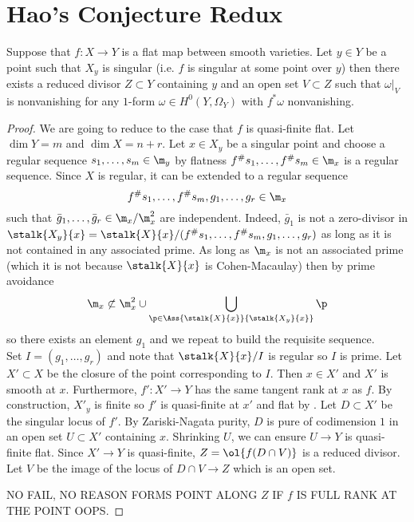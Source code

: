 \documentclass[12pt]{article}
\theoremstyle{plain}
\begin{document}
\section{Hao's Conjecture Redux}

\begin{lemma}
Suppose that $f : X \to Y$ is a flat map between smooth varieties. Let $y \in Y$ be a point such that $X_y$ is singular (i.e. $f$ is singular at some point over $y$) then there exists a reduced divisor $Z \subset Y$ containing $y$ and an open set $V \subset Z$ such that $\omega|_{V}$ is nonvanishing for any $1$-form $\omega \in H^0(Y, \Omega_Y)$ with $f^* \omega$ nonvanishing.
\end{lemma}

\begin{proof}
We are going to reduce to the case that $f$ is quasi-finite flat. Let $\dim{Y} = m$ and $\dim{X} = n + r$. Let $x \in X_y$ be a singular point and choose a regular sequence $s_1, \dots, s_m \in \m_y$ by flatness $f^\# s_1, \dots, f^\# s_m \in \m_x$ is a regular sequence. Since $X$ is regular, it can be extended to a regular sequence
\[ f^\# s_1, \dots, f^\# s_m, g_1, \dots, g_{r} \in \m_x \]
such that $\bar{g}_1, \dots, \bar{g}_r \in \m_x / \m_x^2$ are independent. Indeed, $\bar{g}_1$ is not a zero-divisor in $\stalk{X_y}{x} = \stalk{X}{x} / (f^\# s_1, \dots, f^\# s_m, g_1, \dots, g_{r})$ as long as it is not contained in any associated prime. As long as $\m_x$ is not an associated prime (which it is not because $\stalk{X}{x}$ is Cohen-Macaulay) then by prime avoidance
\[ \m_x \not\subset \m_x^2 \cup \bigcup_{\p \in \Ass{\stalk{X}{x}}{\stalk{X_y}{x}}} \p \]
so there exists an element $g_1$ and we repeat to build the requisite sequence.
\bigskip\\
Set $I = (g_1, \dots, g_r)$ and note that $\stalk{X}{x} / I$ is regular so $I$ is prime. Let $X' \subset X$ be the closure of the point corresponding to $I$. Then $x \in X'$ and $X'$ is smooth at $x$. Furthermore, $f' : X' \to Y$ has the same tangent rank at $x$ as $f$. By construction, $X'_y$ is finite so $f'$ is quasi-finite at $x'$ and flat by . Let $D \subset X'$ be the singular locus of $f'$. By Zariski-Nagata purity, $D$ is pure of codimension $1$ in an open set $U \subset X'$ containing $x$. Shrinking $U$, we can ensure $U \to Y$ is quasi-finite flat. Since $X' \to Y$ is quasi-finite, $Z = \ol{f(D \cap V)}$ is a reduced divisor. Let $V$ be the image of the \etale locus of $D \cap V \to Z$ which is an open set.

NO FAIL, NO REASON FORMS POINT ALONG $Z$ IF $f$ IS FULL RANK AT THE POINT OOPS.
\end{proof}
\end{document}
